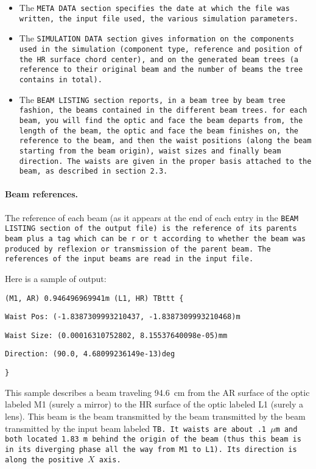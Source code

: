\documentclass{article}
\begin{document}
\begin{itemize}
\item The \tt{META DATA} section specifies the date at which the file was written, the input file used, the various simulation parameters.

\item The \tt{SIMULATION DATA} section gives information on the components used in the simulation (component type, reference and position of the HR surface chord center), and on the generated beam trees (a reference to their original beam and the number of beams the tree contains in total).

\item The \tt{BEAM LISTING} section reports, in a beam tree by beam tree fashion, the beams  contained in the different beam trees. for each beam, you will find the optic and face the beam departs from, the length of the beam, the optic and face the beam finishes on, the reference to the beam, and then the waist positions (along the beam starting from the beam origin), waist sizes and finally beam direction. The waists are given in the proper basis attached to the beam, as described in section 2.3.
\end{itemize}

\paragraph{Beam references.}The reference of each beam (as it appears at the end of each entry in the \tt{BEAM LISTING} section of the output file) is the reference of its parents beam plus a tag which can be \tt{r} or \tt{t} according to whether the beam was produced by reflexion or transmission of the parent beam. The references of the input beams are read in the input file.


Here is a sample of output:

\tt{(M1, AR) 0.946496969941m (L1, HR) TBttt \{}

	\quad	\tt{Waist Pos: (-1.8387309993210437, -1.8387309993210468)m}

	\quad	\tt{Waist Size: (0.00016310752802, 8.15537640098e-05)mm}

	\quad	\tt{Direction: (90.0, 4.68099236149e-13)deg}

	\tt{\}}

This sample describes a beam traveling 94.6~cm from the AR surface of the optic labeled M1 (surely a mirror) to the HR surface of the optic labeled L1 (surely a lens). This beam is the beam transmitted by the beam transmitted by the beam transmitted by the input beam labeled \tt{TB}. It waists are about .1~$\mu$m and both located 1.83~m behind the origin of the beam (thus this beam is in its diverging phase all the way from M1 to L1). Its direction is along the positive $X$ axis.
\end{document}
